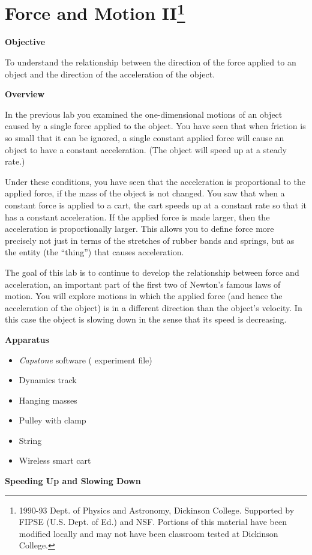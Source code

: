 
\section{Force and Motion II\footnote{
1990-93 Dept. of Physics and Astronomy, Dickinson College. Supported by FIPSE
(U.S. Dept. of Ed.) and NSF. Portions of this material have been modified locally
and may not have been classroom tested at Dickinson College.
}}


\makelabheader %

\textbf{Objective} 

To understand the relationship between the direction of the force applied to
an object and the direction of the acceleration of the object. 

\textbf{Overview} 

In the previous lab you examined the one-dimensional motions of an object caused
by a single force applied to the object. You have seen that when friction is
so small that it can be ignored, a single constant applied force will cause
an object to have a constant acceleration. (The object will speed up at a steady
rate.) 

Under these conditions, you have seen that the acceleration is proportional
to the applied force, if the mass of the object is not changed. You saw that
when a constant force is applied to a cart, the cart speeds up at a constant
rate so that it has a constant acceleration. If the applied force is made larger,
then the acceleration is proportionally larger. This allows you to define force
more precisely not just in terms of the stretches of rubber bands and springs,
but as the entity (the ``thing'') that causes acceleration.

The goal of this lab is to continue to develop the relationship between force
and acceleration, an important part of the first two of Newton's famous laws
of motion. You will explore motions in which the applied force (and hence the
acceleration of the object) is in a different direction than the object's velocity.
In this case the object is slowing down in the sense that its speed is decreasing.

\textbf{Apparatus}

\begin{itemize}
\item \textit{Capstone} software ( experiment file)
\item Dynamics track
\item Hanging masses
\item Pulley with clamp
\item String
\item Wireless smart cart
\end{itemize}
\textbf{Speeding Up and Slowing Down }

